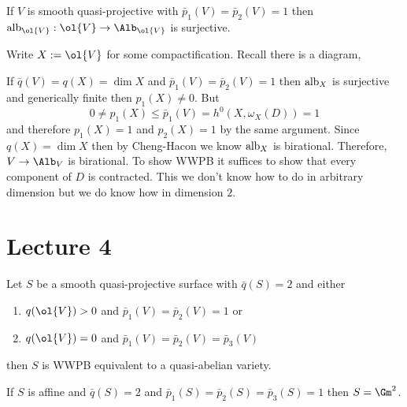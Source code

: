 \documentclass[12pt]{article}
\theoremstyle{plain}
\begin{document}
\begin{prop}
If $V$ is smooth quasi-projective with $\bar{p}_1(V) = \bar{p}_2(V) = 1$ then $\alb_{\ol{V}} : \ol{V} \to \Alb_{\ol{V}}$ is surjective. 
\end{prop}

Write $X := \ol{V}$ for some compactification.
Recall there is a diagram,
\begin{center}
\end{center}
If $\bar{q}(V) = q(X) = \dim{X}$ and $\bar{p}_1(V) = \bar{p}_2(V) = 1$ then $\mathrm{alb}_X$ is surjective and generically finite then $p_1(X) \neq 0$. But
\[ 0 \neq p_1(X) \le \bar{p}_1(V) = h^0(X, \omega_X(D)) = 1 \]
and therefore $p_1(X) = 1$ and $p_2(X) = 1$ by the same argument. Since $q(X) = \dim{X}$ then by Cheng-Hacon we know $\mathrm{alb}_X$ is birational. Therefore, $V \to \Alb_V$ is birational. To show WWPB it suffices to show that every component of $D$ is contracted. This we don't know how to do in arbitrary dimension but we do know how in dimension $2$. 

\section{Lecture 4}

\begin{theorem}
Let $S$ be a smooth quasi-projective surface with $\bar{q}(S) = 2$ and either
\begin{enumerate}
\item $q(\ol{V}) > 0$ and $\bar{p}_1(V) = \bar{p}_2(V) = 1$ or
\item $q(\ol{V}) = 0$ and $\bar{p}_1(V) = \bar{p}_2(V) = \bar{p}_3(V)$
\end{enumerate} 
then $S$ is WWPB equivalent to a quasi-abelian variety.
\end{theorem}

\begin{cor}
If $S$ is affine and $\bar{q}(S) = 2$ and $\bar{p}_1(S) = \bar{p}_2(S) = \bar{p}_3(S) = 1$ then $S = \Gm^2$. 
\end{cor}
\end{document}
